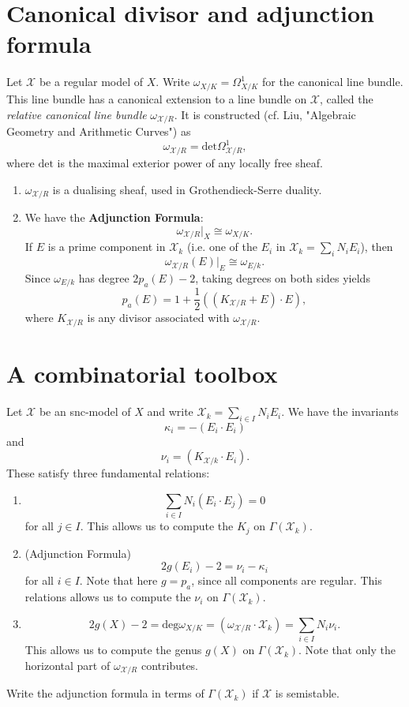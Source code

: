 \section*{Canonical divisor and adjunction formula}
Let $\mathcal{X}$ be a regular model of $X$. Write $\omega_{X/K} = \Omega^1_{X/K}$ for the canonical line bundle. This line bundle has a canonical extension to a line bundle on $\mathcal{X}$, called the \emph{relative canonical line bundle} $\omega_{\mathcal{X}/R}$. It is constructed (cf. Liu, "Algebraic Geometry and Arithmetic Curves") as $$\omega_{\mathcal{X}/R} = \mathrm{det}\Omega^1_{\mathcal{X}/R},$$ where $\mathrm{det}$ is the maximal exterior power of any locally free sheaf.

\begin{enumerate}
\item $\omega_{\mathcal{X}/R}$ is a dualising sheaf, used in Grothendieck-Serre duality.
\item We have the {\bfseries Adjunction Formula}: $$\omega_{\mathcal{X}/R}|_X \cong \omega_{X/K}.$$ If $E$ is a prime component in $\mathcal{X}_k$ (i.e. one of the $E_i$ in $\mathcal{X}_k = \sum_{i} N_iE_i$), then $$\omega_{\mathcal{X}/R}(E)|_E \cong \omega_{E/k}.$$ Since $\omega_{E/k}$ has degree $2p_a(E) -2$, taking degrees on both sides yields $$p_a(E) = 1 + \frac{1}{2}((K_{\mathcal{X}/R} + E)\cdot E),$$ where $K_{\mathcal{X}/R}$ is any divisor associated with $\omega_{\mathcal{X}/R}$.
\end{enumerate}

\section*{A combinatorial toolbox}
Let $\mathcal{X}$ be an snc-model of $X$ and write $\mathcal{X}_k = \sum_{i \in I} N_i E_i$. We have the invariants $$\kappa_i = -(E_i \cdot E_i)$$ and $$\nu_i = (K_{\mathcal{X}/k}\cdot E_i).$$ %
These satisfy three fundamental relations:
\begin{enumerate}
\item $$\sum_{i \in I} N_i (E_i \cdot E_j) = 0$$ for all $j \in I$. This allows us to compute the $K_j$ on $\Gamma(\mathcal{X}_k)$.
\item (Adjunction Formula) $$2g(E_i)-2 = \nu_i - \kappa_i$$ for all $i \in I$. Note that here $g = p_a$, since all components are regular. This relations allows us to compute the $\nu_i$ on $\Gamma(\mathcal{X}_k)$.
\item $$2g(X)-2 = \mathrm{deg}\omega_{X/K} = (\omega_{\mathcal{X}/R} \cdot \mathcal{X}_k) = \sum_{i \in I} N_i \nu_i.$$ This allows us to compute the genus $g(X)$ on $\Gamma(\mathcal{X}_k)$. Note that only the horizontal part of $\omega_{\mathcal{X}/R}$ contributes.
\end{enumerate}

\begin{exercise} Write the adjunction formula in terms of $\Gamma(\mathcal{X}_k)$ if $\mathcal{X}$ is semistable. \end{exercise}


